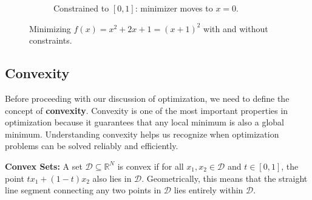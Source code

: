 \begin{exampleBox}
\begin{figure}[H]
\begin{subfigure}{0.47\textwidth}
        \caption{Constrained to $[0,1]$: minimizer moves to $x=0$.}
        \end{subfigure}
        \caption{Minimizing $f(x)=x^2+2x+1=(x+1)^2$ with and without constraints.}
    \end{figure}
\end{exampleBox}


\subsection{Convexity}
\label{sec:convexity}
Before proceeding with our discussion of optimization, we need to define the concept of \textbf{convexity}. Convexity is one of the most important properties in optimization because it guarantees that any local minimum is also a global minimum. Understanding convexity helps us recognize when optimization problems can be solved reliably and efficiently.

\textbf{Convex Sets:}
A set $\mathcal{D} \subseteq \mathbb{R}^N$ is convex if for all $x_1,x_2 \in \mathcal{D}$ and $t\in[0,1]$, the point $t x_1 + (1-t) x_2$ also lies in $\mathcal{D}$. Geometrically, this means that the straight line segment connecting any two points in $\mathcal{D}$ lies entirely within $\mathcal{D}$.


